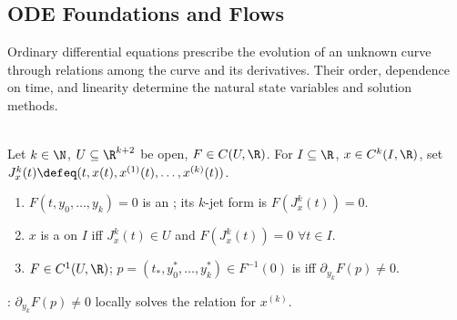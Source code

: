 \subsection{ODE Foundations and Flows}

Ordinary differential equations prescribe the evolution of an unknown curve through relations among the curve and its derivatives. Their order, dependence on time, and linearity determine the natural state variables and solution methods.

\begin{definition} \label{def:implicit-scalar-ode-and-regular-point} \\
Let $k\in\N$, $U\subseteq\R^{k+2}$ be open, $F\in C(U,\R)$. For $I\subseteq\R$, $x\in C^k(I,\R)$, set $J_x^k(t)\defeq(t,x(t),x^{(1)}(t),\ldots,x^{(k)}(t))$.
\begin{enumerate}[label=(\roman*)]
\setlength{\itemsep}{0pt}
\item $F(t,y_0,\ldots,y_k)=0$ is an ; its $k$-jet form is $F(J_x^k(t))=0$.
\item $x$ is a  on $I$ iff $J_x^k(t)\in U$ and $F(J_x^k(t))=0$ $\forall t\in I$.
\item $F\in C^1(U,\R)$; $p=(t_*,y_0^*,\ldots,y_k^*)\in F^{-1}(0)$ is  iff $\partial_{y_k}F(p)\neq0$.
\end{enumerate}
: $\partial_{y_k}F(p)\neq0$ locally solves the relation for $x^{(k)}$.
\end{definition}

